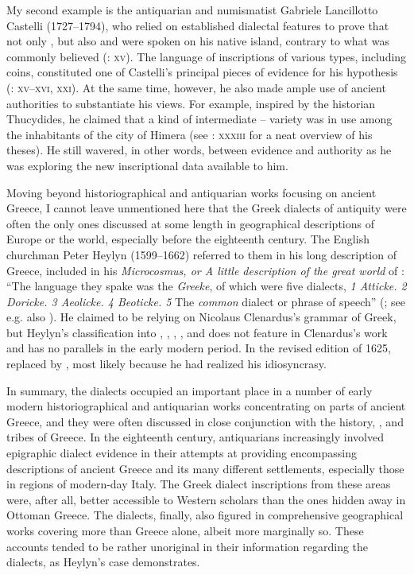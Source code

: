 My second example is the  antiquarian and numismatist Gabriele Lancillotto Castelli (1727–1794), who relied on established dialectal features to prove that not only , but also  and  were spoken on his native island, contrary to what was commonly believed (\citeyear{Castelli1769}: \textsc{xv}). The language of inscriptions of various types, including coins, constituted one of Castelli’s principal pieces of evidence for his hypothesis (\citealt{Castelli1769}: \textsc{xv–xvi,} \textsc{xxi}). At the same time, however, he also made ample use of ancient authorities to substantiate his views. For example, inspired by the historian Thucydides, he claimed that a kind of intermediate –  variety was in use among the inhabitants of the  city of Himera (see \citealt{Castelli1769}: \textsc{xxxiii} for a neat overview of his theses). He still wavered, in other words, between evidence and authority as he was exploring the new inscriptional data available to him.

Moving beyond historiographical and antiquarian works focusing on ancient Greece, I cannot leave unmentioned here that the Greek dialects of antiquity were often the only ones discussed at some length in geographical descriptions of Europe or the world, especially before the eighteenth century. The English churchman Peter Heylyn (1599–1662) referred to them in his long description of Greece, included in his \textit{Microcosmus, or A little description of the great world} of \citeyear{Heylyn1621}: “The language they spake was the \textit{Greeke}, of which were five dialects, \textit{1 Atticke. 2 Doricke. 3 Aeolicke. 4 Beoticke. 5} The \textit{common} dialect or phrase of speech” (\citealt[205]{Heylyn1621}; see e.g. also \citealt[15, 60, 63]{Speed1676}). He claimed to be relying on Nicolaus Clenardus’s grammar of Greek, but Heylyn’s classification into , , , , and  does not feature in Clenardus’s work and has no parallels in the early modern period. In the revised edition of 1625, \citet[375]{Heylyn1625} replaced  by , most likely because he had realized his idiosyncrasy.

In summary, the dialects occupied an important place in a number of early modern historiographical and antiquarian works concentrating on parts of ancient Greece, and they were often discussed in close conjunction with the history, , and tribes of Greece. In the eighteenth century, antiquarians increasingly involved epigraphic dialect evidence in their attempts at providing encompassing descriptions of ancient Greece and its many different settlements, especially those in regions of modern-day Italy. The Greek dialect inscriptions from these areas were, after all, better accessible to Western scholars than the ones hidden away in Ottoman Greece. The dialects, finally, also figured in comprehensive geographical works covering more than Greece alone, albeit more marginally so. These accounts tended to be rather unoriginal in their information regarding the dialects, as Heylyn’s case demonstrates.

